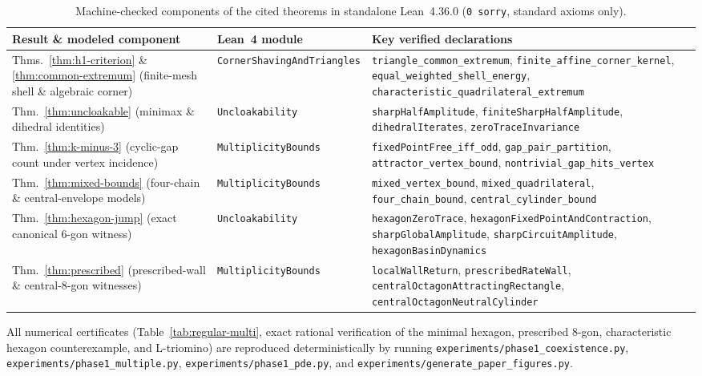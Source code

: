 \documentclass[11pt,reqno]{amsart}
\theoremstyle{definition}
\theoremstyle{remark}
\begin{document}
\begin{table}[ht]
\centering
\caption{Machine-checked components of the cited theorems in standalone Lean~4.36.0 (\texttt{0 sorry}, standard axioms only).}
\label{tab:lean-p1}
\scriptsize
\setlength{\tabcolsep}{3.5pt}
\begin{tabular}{@{}>{\raggedright\arraybackslash}p{}l>{\raggedright\arraybackslash}p{}@{}}
\toprule
Result \& modeled component & Lean~4 module & Key verified declarations \\
\midrule
Thms.~\ref{thm:h1-criterion} \& \ref{thm:common-extremum} (finite-mesh shell \& algebraic corner) & \texttt{CornerShavingAndTriangles} & \texttt{triangle\_common\_extremum}, \texttt{finite\_affine\_corner\_kernel}, \texttt{equal\_weighted\_shell\_energy}, \texttt{characteristic\_quadrilateral\_extremum} \\
Thm.~\ref{thm:uncloakable} (minimax \& dihedral identities) & \texttt{Uncloakability} & \texttt{sharpHalfAmplitude}, \texttt{finiteSharpHalfAmplitude}, \texttt{dihedralIterates}, \texttt{zeroTraceInvariance} \\
Thm.~\ref{thm:k-minus-3} (cyclic-gap count under vertex incidence) & \texttt{MultiplicityBounds} & \texttt{fixedPointFree\_iff\_odd}, \texttt{gap\_pair\_partition}, \texttt{attractor\_vertex\_bound}, \texttt{nontrivial\_gap\_hits\_vertex} \\
Thm.~\ref{thm:mixed-bounds} (four-chain \& central-envelope models) & \texttt{MultiplicityBounds} & \texttt{mixed\_vertex\_bound}, \texttt{mixed\_quadrilateral}, \texttt{four\_chain\_bound}, \texttt{central\_cylinder\_bound} \\
Thm.~\ref{thm:hexagon-jump} (exact canonical 6-gon witness) & \texttt{Uncloakability} & \texttt{hexagonZeroTrace}, \texttt{hexagonFixedPointAndContraction}, \texttt{sharpGlobalAmplitude}, \texttt{sharpCircuitAmplitude}, \texttt{hexagonBasinDynamics} \\
Thm.~\ref{thm:prescribed} (prescribed-wall \& central-8-gon witnesses) & \texttt{MultiplicityBounds} & \texttt{localWallReturn}, \texttt{prescribedRateWall}, \texttt{centralOctagonAttractingRectangle}, \texttt{centralOctagonNeutralCylinder} \\
\bottomrule
\end{tabular}
\end{table}

All numerical certificates (Table~\ref{tab:regular-multi}, exact rational verification of the minimal hexagon, prescribed 8-gon, characteristic hexagon counterexample, and L-triomino) are reproduced deterministically by running \texttt{experiments/\allowbreak phase1\_coexistence.py}, \texttt{experiments/\allowbreak phase1\_multiple.py}, \texttt{experiments/\allowbreak phase1\_pde.py}, and \texttt{experiments/\allowbreak generate\_paper\_figures.py}.
\end{document}
